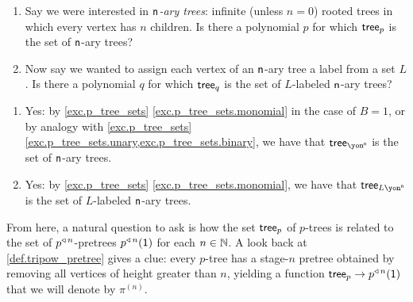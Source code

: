 \documentclass[Book-Poly]{subfiles}
\begin{document}
\begin{exercise} \label{exc.n_ary_trees}
\begin{enumerate}
    \item Say we were interested in \emph{$\mathsf{n}$-ary trees}: infinite (unless $n=0$) rooted trees in which every vertex has $n$ children.
    Is there a polynomial $p$ for which $\mathsf{tree}_p$ is the set of $\mathsf{n}$-ary trees?
    \item \label{exc.n_ary_trees.l_labeled} Now say we wanted to assign each vertex of an $\mathsf{n}$-ary tree a label from a set $L$.
    Is there a polynomial $q$ for which $\mathsf{tree}_q$ is the set of $L$-labeled $\mathsf{n}$-ary trees?\qedhere
\end{enumerate}
\begin{solution}
\begin{enumerate}
    \item Yes: by \cref{exc.p_tree_sets} \cref{exc.p_tree_sets.monomial} in the case of $B=1$, or by analogy with \cref{exc.p_tree_sets} \cref{exc.p_tree_sets.unary,exc.p_tree_sets.binary}, we have that $\tr_{\yon^\ord{n}}$ is the set of $\mathsf{n}$-ary trees.
    \item Yes: by \cref{exc.p_tree_sets} \cref{exc.p_tree_sets.monomial}, we have that $\tr_{L\yon^\ord{n}}$ is the set of $L$-labeled $\mathsf{n}$-ary trees.
\end{enumerate}
\end{solution}
\end{exercise}

From here, a natural question to ask is how the set $\mathsf{tree}_p$ of $p$-trees is related to the set of $p^{\mathbin{\triangleleft}\,n}$-pretrees $p^{\mathbin{\triangleleft}\,n}(\textsf{1})$ for each $n\in\mathbb{N}$.
A look back at \cref{def.tripow_pretree} gives a clue: every $p$-tree has a stage-$n$ pretree obtained by removing all vertices of height greater than $n$, yielding a function $\mathsf{tree}_p\to p^{\mathbin{\triangleleft}\,n}(\textsf{1})$ that we will denote by $\pi^{(n)}$.
\end{document}
